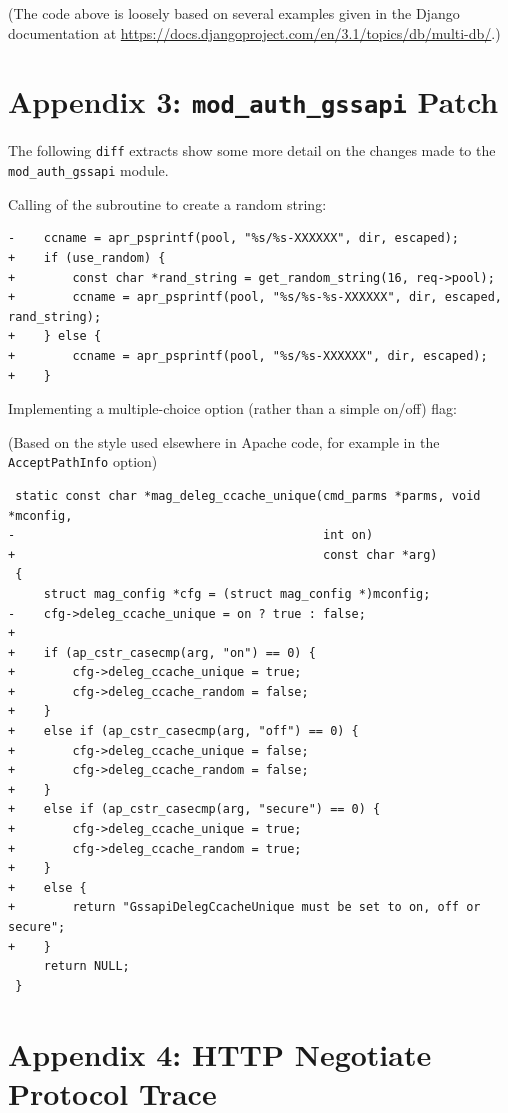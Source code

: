\documentclass{report}
\begin{document}
(The code above is loosely based on several examples given in the Django documentation at \url{https://docs.djangoproject.com/en/3.1/topics/db/multi-db/}.)

\chapter*{Appendix 3: \texttt{mod\_auth\_gssapi} Patch}
\label{sec:appendix3}

The following \texttt{diff} extracts show some more detail on the changes made to the \verb+mod_auth_gssapi+ module.

Calling of the subroutine to create a random string:

\begin{verbatim}
-    ccname = apr_psprintf(pool, "%s/%s-XXXXXX", dir, escaped);
+    if (use_random) {
+        const char *rand_string = get_random_string(16, req->pool);
+        ccname = apr_psprintf(pool, "%s/%s-%s-XXXXXX", dir, escaped, rand_string);
+    } else {
+        ccname = apr_psprintf(pool, "%s/%s-XXXXXX", dir, escaped);
+    }
\end{verbatim}

Implementing a multiple-choice option (rather than a simple on/off) flag:

(Based on the style used elsewhere in Apache code, for example in the \texttt{AcceptPathInfo} option\cite{AcceptPathInfo-source})

\begin{verbatim}
 static const char *mag_deleg_ccache_unique(cmd_parms *parms, void *mconfig,
-                                           int on)
+                                           const char *arg)
 {
     struct mag_config *cfg = (struct mag_config *)mconfig;
-    cfg->deleg_ccache_unique = on ? true : false;
+
+    if (ap_cstr_casecmp(arg, "on") == 0) {
+        cfg->deleg_ccache_unique = true;
+        cfg->deleg_ccache_random = false;
+    }
+    else if (ap_cstr_casecmp(arg, "off") == 0) {
+        cfg->deleg_ccache_unique = false;
+        cfg->deleg_ccache_random = false;
+    }
+    else if (ap_cstr_casecmp(arg, "secure") == 0) {
+        cfg->deleg_ccache_unique = true;
+        cfg->deleg_ccache_random = true;
+    }
+    else {
+        return "GssapiDelegCcacheUnique must be set to on, off or secure";
+    }
     return NULL;
 }
\end{verbatim}

\chapter*{Appendix 4: HTTP Negotiate Protocol Trace}
\label{sec:appendix4}
\end{document}
